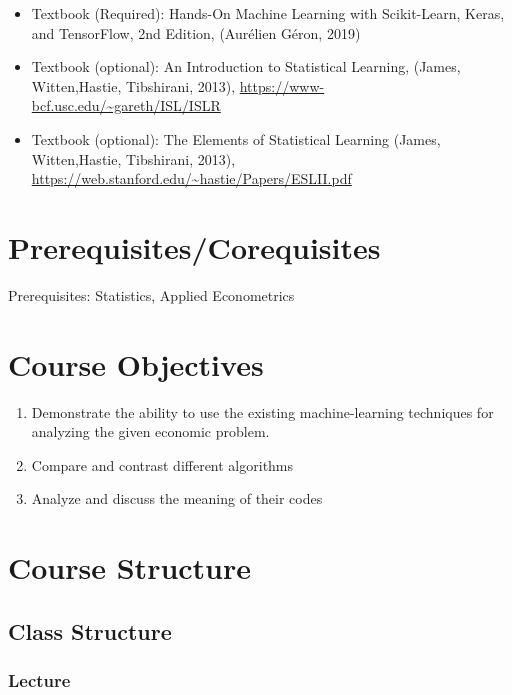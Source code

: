 \documentclass[11pt]{article}
\begin{document}
\begin{itemize}
\item Textbook (Required): Hands-On Machine Learning with Scikit-Learn, Keras, and TensorFlow, 2nd Edition, (Aurélien Géron, 2019)
\item Textbook (optional): An Introduction to Statistical Learning, (James, Witten,Hastie, Tibshirani,
2013), \url{https://www-bcf.usc.edu/~gareth/ISL/ISLR}
\item Textbook (optional): The Elements of Statistical Learning (James, Witten,Hastie, Tibshirani, 2013), \url{https://web.stanford.edu/~hastie/Papers/ESLII.pdf}
\end{itemize}


\section*{Prerequisites/Corequisites}
Prerequisites: Statistics, Applied Econometrics


\section*{Course Objectives}
\begin{enumerate}
\item Demonstrate the ability to use the existing machine-learning techniques for analyzing the given economic problem.
\item Compare and contrast different algorithms
\item Analyze and discuss the meaning of their codes
\end{enumerate}


\section*{Course Structure}

\subsection*{Class Structure}

\subsubsection*{Lecture}
\end{document}
